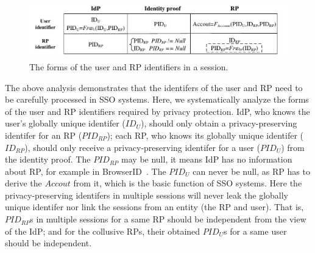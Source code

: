 
\begin{figure}
  \centering
  \includegraphics[width=\linewidth]{fig/IDCorrelation.pdf}
  \caption{The forms of  the user and RP identifiers in a session.}
  \label{fig:IDCorrelation}
\end{figure}

The above analysis demonstrates that the identifers of the user and RP need to be carefully processed in SSO systems.
Here, we systematically analyze the forms of the user and RP identifiers required by privacy protection.
IdP, who knows the user's globally unique identifer ($ID_U$), should only obtain a privacy-preserving identifer for an RP ($PID_{RP}$);
 each RP, who knows its globally unique identifer ($ID_{RP}$), should only receive a privacy-preserving identifer for a user ($PID_{U}$) from the identity proof.
The $PID_{RP}$ may be null, it means IdP has no information about RP, for example in BrowserID~\cite{BrowserID}.
The $PID_{U}$ can never be null, as RP has to derive the $Accout$ from it, which is the basic function of SSO systems.
Here the  privacy-preserving identifers in multiple sessions will never leak the globally unique identifer nor link the sessions from an entity (the RP and user).
That is, $PID_{RP}$s in multiple sessions for a same RP  should be independent from the view of the IdP;
 and for the collusive RPs, their obtained $PID_{U}$s for a same user should be independent.

